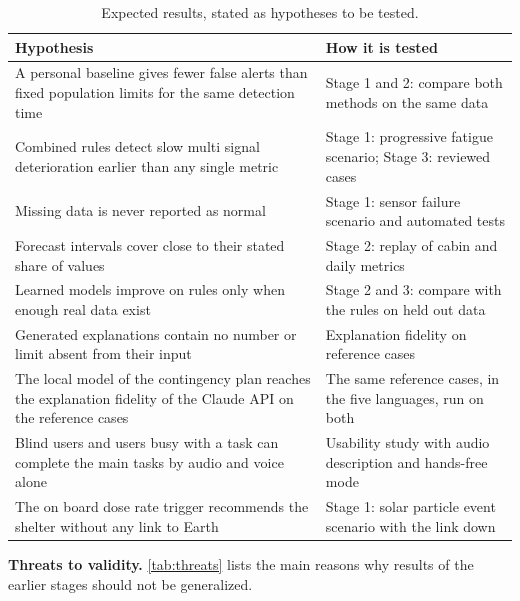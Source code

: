 \begin{table}[htbp]
\centering
\vspace{0.8em}
\caption{Expected results, stated as hypotheses to be tested.}
\label{tab:detection}
\footnotesize
\begin{tabular}{p{4.4cm}p{9.6cm}}
\hline
\textbf{Hypothesis} & \textbf{How it is tested} \\
\hline
A personal baseline gives fewer false alerts than fixed population limits for the same detection time & Stage 1 and 2: compare both methods on the same data \\
Combined rules detect slow multi signal deterioration earlier than any single metric & Stage 1: progressive fatigue scenario; Stage 3: reviewed cases \\
Missing data is never reported as normal & Stage 1: sensor failure scenario and automated tests \\
Forecast intervals cover close to their stated share of values & Stage 2: replay of cabin and daily metrics \\
Learned models improve on rules only when enough real data exist & Stage 2 and 3: compare with the rules on held out data \\
Generated explanations contain no number or limit absent from their input & Explanation fidelity on reference cases \\
The local model of the contingency plan reaches the explanation fidelity of the Claude API on the reference cases & The same reference cases, in the five languages, run on both \\
Blind users and users busy with a task can complete the main tasks by audio and voice alone & Usability study with audio description and hands-free mode \\
The on board dose rate trigger recommends the shelter without any link to Earth & Stage 1: solar particle event scenario with the link down \\
\hline
\end{tabular}
\vspace{1.2em}
\end{table}

\medskip\noindent\textbf{Threats to validity.} \ref{tab:threats} lists the main reasons why results of the earlier stages should not be generalized.

